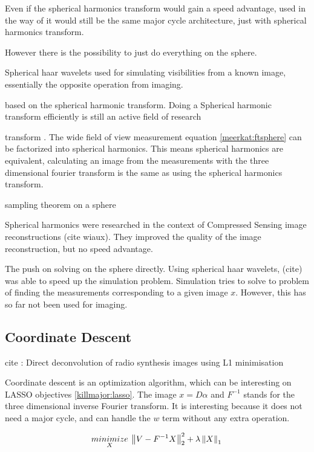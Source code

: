 Even if the spherical harmonics transform would gain a speed advantage, used in the way of \cite{carozzi2015imaging} it would still be the same major cycle architecture, just with spherical harmonics transform.

However there is the possibility to just do everything on the sphere.

Spherical haar wavelets used for simulating visibilities from a known image, essentially the opposite operation from imaging. \cite{mcewen2008simulating}

based on the spherical harmonic transform. Doing a Spherical harmonic transform efficiently is still an active field of research \cite{schaeffer2013efficient}

transform
. The wide field of view measurement equation \eqref{meerkat:ftsphere} can be factorized into spherical harmonics. This means spherical harmonics are equivalent, calculating an image from the measurements with the three dimensional fourier transform is the same as using the spherical harmonics transform. \cite{shaw2014all}

\cite{mcewen2013sparse}sampling theorem on a sphere



Spherical harmonics were researched in the context of Compressed Sensing image reconstructions (cite wiaux). They improved the quality of the image reconstruction, but no speed advantage.

The push on solving on the sphere directly. Using spherical haar wavelets, (cite) was able to speed up the simulation problem. Simulation tries to solve to problem of finding the measurements corresponding to a given image $x$. However, this has so far not been used for imaging.


\subsection{Coordinate Descent}

cite : Direct deconvolution of radio synthesis images using L1 minimisation

Coordinate descent is an optimization algorithm, which can be interesting on LASSO objectives \eqref{killmajor:lasso}. The image $x = D\alpha$ and $F^{-1}$ stands for the three dimensional inverse Fourier transform. It is interesting because it does not need a major cycle, and can handle the $w$ term without any extra operation.


\begin{equation}\label{killmajor:lasso}
\underset{X}{minimize} \: \left \| V - F^{-1}X \right \|_2^2 + \lambda \left \| X \right \|_1 \\
\end{equation}

